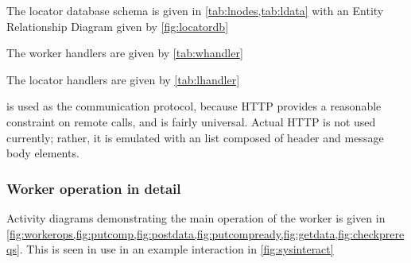 



The locator database schema is given in \cref{tab:lnodes,tab:ldata} with an Entity Relationship Diagram given by \cref{fig:locatordb}




The worker handlers are given by \cref{tab:whandler}


The locator handlers are given by \cref{tab:lhandler}


 is used as the communication protocol, because HTTP provides a reasonable constraint on remote calls, and is fairly universal.
Actual HTTP is not used currently; rather, it is emulated with an \R{} list composed of header and message body elements.

\subsubsection{Worker operation in detail}

Activity diagrams demonstrating the main operation of the worker is given in \cref{fig:workerops,fig:putcomp,fig:postdata,fig:putcompready,fig:getdata,fig:checkprereqs}.
This is seen in use in an example interaction in \cref{fig:sysinteract}


